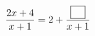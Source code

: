 \hspace*{2mm}\begin{minipage}[t]{\dimexpr\linewidth-2mm\relax}\vspace{0pt}
$\dfrac{2x+4}{x+1}=2+\dfrac{\blank}{x+1}$\end{minipage}
